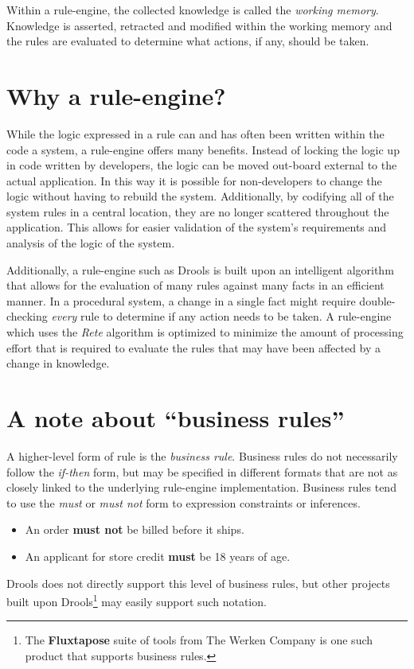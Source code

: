 Within a rule-engine, the collected knowledge is called the
\emph{working memory}.  Knowledge is
asserted, retracted and modified within the working memory and the
rules are evaluated to determine what actions, if any, should be
taken.

\section{Why a rule-engine?}

While the logic expressed in a rule can and has often been written
within the code a system, a rule-engine offers many benefits.  Instead
of locking the logic up in code written by developers, the logic can
be moved out-board external to the actual application.  In this way
it is possible for non-developers to change the logic without having
to rebuild the system.  Additionally, by codifying all of the system
rules in a central location, they are no longer scattered throughout
the application.  This allows for easier validation of the system's
requirements and analysis of the logic of the system.

Additionally, a rule-engine such as Drools is built upon an
intelligent algorithm that allows for the evaluation of many
rules against many facts in an efficient manner.  In a procedural
system, a change in a single fact might require double-checking
\emph{every} rule to determine if any action needs to be taken.
A rule-engine which uses the \emph{Rete} algorithm
is optimized to minimize the amount of processing effort that is
required to evaluate the rules that may have been affected by
a change in knowledge.

\section{A note about ``business rules''}

A higher-level form of rule is the \emph{business rule}.  Business rules do not necessarily follow the \emph{if-then}
form, but may be specified in different formats that are not as
closely linked to the underlying rule-engine implementation.  Business
rules tend to use the \emph{must} or \emph{must not} form to
expression constraints or inferences.

\begin{itemize}
  \item An order \textbf{must not} be billed before it ships.
  \item An applicant for store credit \textbf{must} be 18 years of age.
\end{itemize}

Drools does not directly support this level of business rules, but
other projects built upon Drools\footnote{The
\textbf{Fluxtapose}
suite of tools from The Werken Company is one such product that
supports business rules.} may easily support such
notation.

